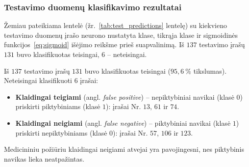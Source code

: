 \subsubsection{Testavimo duomenų klasifikavimo rezultatai}

Žemiau pateikiama lentelė (žr.~\ref{tab:test_predictions} lentelę) su kiekvieno testavimo duomenų įrašo neurono nustatyta klase, tikrąja klase ir sigmoidinės funkcijos~\eqref{eq:sigmoid} išėjimo reikšme prieš suapvalinimą. Iš $137$ testavimo įrašų $131$ buvo klasifikuotas teisingai, $6$ – neteisingai.



Iš $137$ testavimo įrašų $131$ buvo klasifikuotas teisingai ($95{,}6\ \%$ tikslumas). Neteisingai klasifikuoti $6$ įrašai:
\begin{itemize}
    \item \textbf{Klaidingai teigiami} (angl. \textit{false positive}) – nepiktybiniai navikai (klasė $0$) priskirti piktybiniams (klasė $1$): įrašai Nr. $13$, $61$ ir $74$.
    \item \textbf{Klaidingai neigiami} (angl. \textit{false negative}) – piktybiniai navikai (klasė $1$) priskirti nepiktybiniams (klasė $0$): įrašai Nr. $57$, $106$ ir $123$.
\end{itemize}
Medicininiu požiūriu klaidingai neigiami atvejai yra pavojingesni, nes piktybinis navikas lieka neatpažintas.